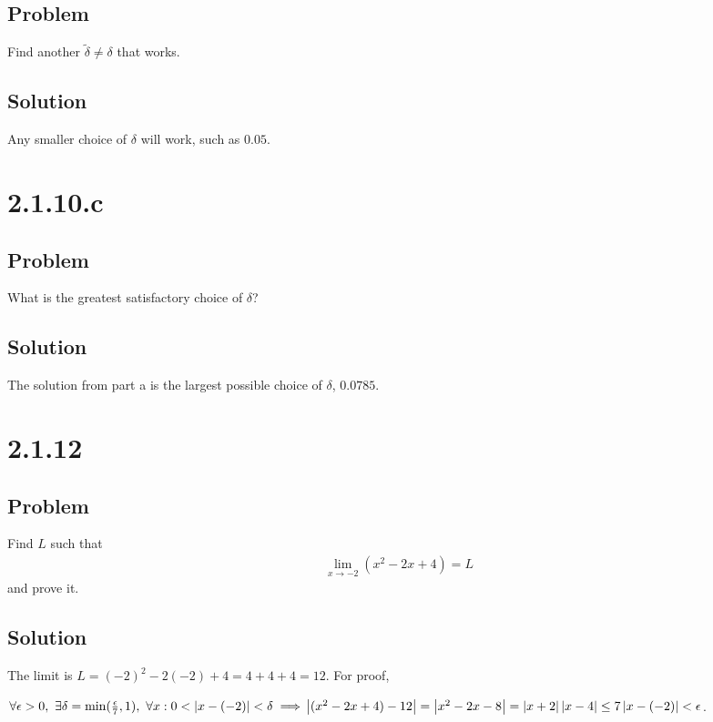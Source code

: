 \documentclass[12pt]{article}
\newcommand{\round}[1]{\left(       #1 \right)      }
\newcommand{\abs}  [1]{\left|       #1 \right|      }
\begin{document}
\subsection*{Problem}
Find another $\tilde{\delta} \neq \delta$ that works.

\subsection*{Solution}
Any smaller choice of $\delta$ will work, such as $\boxed{0.05}$.



\section*{2.1.10.c}

\subsection*{Problem}
What is the greatest satisfactory choice of $\delta$?

\subsection*{Solution}
The solution from part a is the largest possible choice of $\delta$, $\boxed{0.0785}$.



\section*{2.1.12}

\subsection*{Problem}
Find $L$ such that
\begin{align*}
    \lim_{x \to -2} \round{x^2 - 2x + 4} = L
\end{align*}
and prove it.

\subsection*{Solution}
The limit is $L = (-2)^2 - 2(-2) + 4 = 4 + 4 + 4 = 12$. For proof,

$\forall \epsilon > 0,\ \exists \delta = \min(\frac{\epsilon}{7}, 1),\ \forall x : 0 < \abs{x - (-2)} < \delta \implies \\ \abs{(x^2 - 2x + 4) - 12} = \abs{x^2 - 2x - 8} = \abs{x + 2} \abs{x - 4} \leq 7 \abs{x - (-2)} < \epsilon$.
\end{document}
